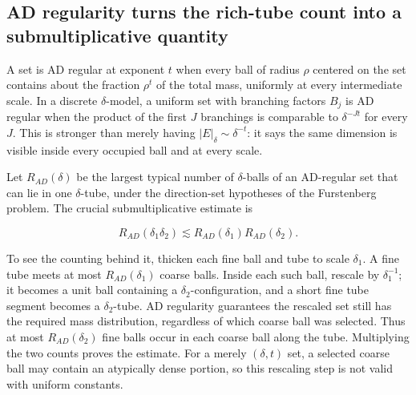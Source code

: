 \subsection{AD regularity turns the rich-tube count into a submultiplicative quantity}\label{04-visual-computing-ii-ch033-ad-regularity-turns-the-rich-tube-count-into-a-submultiplicative-quantity-1}

\hypertarget{04-visual-computing-ii-ch033-ad-regularity-turns-the-rich-tube-count-into-a-submultiplicative-quantity-1}{}

A set is AD regular at exponent \(t\) when every ball of radius \(\rho\) centered on the set contains about the fraction \(\rho^t\) of the total mass, uniformly at every intermediate scale. In a discrete \(\delta\)-model, a uniform set with branching factors \(B_j\) is AD regular when the product of the first \(J\) branchings is comparable to \(\delta^{-Jt}\) for every \(J\). This is stronger than merely having \(|E|_\delta\sim\delta^{-t}\): it says the same dimension is visible inside every occupied ball and at every scale.

Let \(R_{AD}(\delta)\) be the largest typical number of \(\delta\)-balls of an AD-regular set that can lie in one \(\delta\)-tube, under the direction-set hypotheses of the Furstenberg problem. The crucial submultiplicative estimate is

\[R_{AD}(\delta_1\delta_2)\lesssim R_{AD}(\delta_1)R_{AD}(\delta_2).\]

To see the counting behind it, thicken each fine ball and tube to scale \(\delta_1\). A fine tube meets at most \(R_{AD}(\delta_1)\) coarse balls. Inside each such ball, rescale by \(\delta_1^{-1}\); it becomes a unit ball containing a \(\delta_2\)-configuration, and a short fine tube segment becomes a \(\delta_2\)-tube. AD regularity guarantees the rescaled set still has the required mass distribution, regardless of which coarse ball was selected. Thus at most \(R_{AD}(\delta_2)\) fine balls occur in each coarse ball along the tube. Multiplying the two counts proves the estimate. For a merely \((\delta,t)\) set, a selected coarse ball may contain an atypically dense portion, so this rescaling step is not valid with uniform constants.

